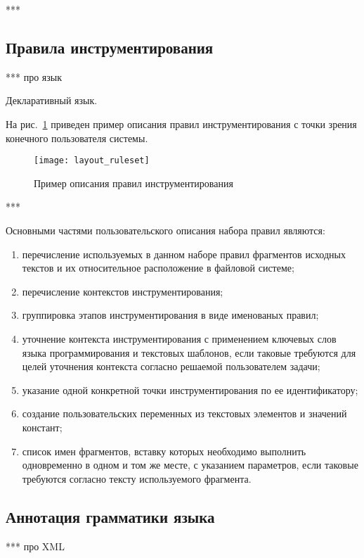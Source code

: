 ***

\subsection{Правила инструментирования}

***
про язык

Декларативный язык.

На рис.~\ref{fig:layout_ruleset} приведен пример описания правил инструментирования с точки зрения конечного пользователя системы.

\begin{figure}[!h]
	\centering
	\texttt{[image: layout\_ruleset]}
	\caption{Пример описания правил инструментирования}
	\label{fig:layout_ruleset}
\end{figure}

***

Основными частями пользовательского описания набора правил являются:
\begin{enumerate}
  \item перечисление используемых в данном наборе правил фрагментов исходных текстов и их относительное расположение в файловой системе;
  \item перечисление контекстов инструментирования;
  \item группировка этапов инструментирования в виде именованых правил;
  \item уточнение контекста инструментирования с применением ключевых слов языка программирования и текстовых шаблонов, если таковые требуются для целей уточнения контекста согласно решаемой пользователем задачи;
  \item указание одной конкретной точки инструментирования по ее идентификатору;
  \item создание пользовательских переменных из текстовых элементов и значений констант;
  \item список имен фрагментов, вставку которых необходимо выполнить одновременно в одном и том же месте, с указанием параметров, если таковые требуются согласно тексту используемого фрагмента.
\end{enumerate}

\subsection{Аннотация грамматики языка}

***
про XML


